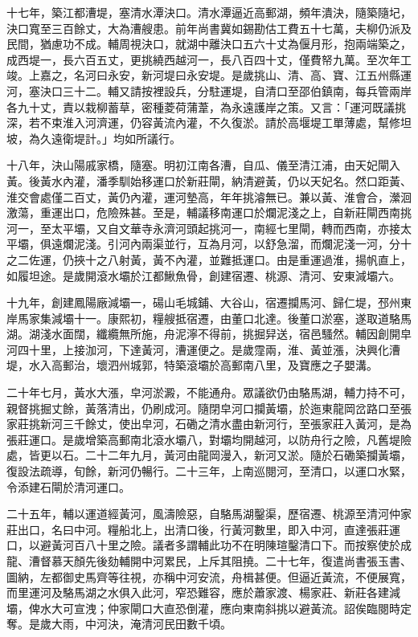 \begin{pinyinscope}
十七年，築江都漕堤，塞清水潭決口。清水潭逼近高郵湖，頻年潰決，隨築隨圮，決口寬至三百餘丈，大為漕艘患。前年尚書冀如錫勘估工費五十七萬，夫柳仍派及民間，猶慮功不成。輔周視決口，就湖中離決口五六十丈為偃月形，抱兩端築之，成西堤一，長六百五丈，更挑繞西越河一，長八百四十丈，僅費帑九萬。至次年工竣。上嘉之，名河曰永安，新河堤曰永安堤。是歲挑山、清、高、寶、江五州縣運河，塞決口三十二。輔又請按裡設兵，分駐運堤，自清口至邵伯鎮南，每兵管兩岸各九十丈，責以栽柳蓄草，密種菱荷蒲葦，為永遠護岸之策。又言：「運河既議挑深，若不束淮入河濟運，仍容黃流內灌，不久復淤。請於高堰堤工單薄處，幫修坦坡，為久遠衛堤計。」均如所議行。

十八年，決山陽戚家橋，隨塞。明初江南各漕，自瓜、儀至清江浦，由天妃閘入黃。後黃水內灌，潘季馴始移運口於新莊閘，納清避黃，仍以天妃名。然口距黃、淮交會處僅二百丈，黃仍內灌，運河墊高，年年挑濬無已。兼以黃、淮會合，瀠洄激蕩，重運出口，危險殊甚。至是，輔議移南運口於爛泥淺之上，自新莊閘西南挑河一，至太平壩，又自文華寺永濟河頭起挑河一，南經七里閘，轉而西南，亦接太平壩，俱遠爛泥淺。引河內兩渠並行，互為月河，以舒急溜，而爛泥淺一河，分十之二佐運，仍挾十之八射黃，黃不內灌，並難抵運口。由是重運過淮，揚帆直上，如履坦途。是歲開滾水壩於江都鰍魚骨，創建宿遷、桃源、清河、安東減壩六。

十九年，創建鳳陽廠減壩一，碭山毛城鋪、大谷山，宿遷攔馬河、歸仁堤，邳州東岸馬家集減壩十一。康熙初，糧艘抵宿遷，由董口北達。後董口淤塞，遂取道駱馬湖。湖淺水面闊，纖纜無所施，舟泥濘不得前，挑掘舁送，宿邑騷然。輔因創開皁河四十里，上接泇河，下達黃河，漕運便之。是歲霪兩，淮、黃並漲，決興化漕堤，水入高郵治，壞泗州城郭，特築滾壩於高郵南八里，及寶應之子嬰溝。

二十年七月，黃水大漲，皁河淤澱，不能通舟。眾議欲仍由駱馬湖，輔力持不可，親督挑掘丈餘，黃落清出，仍刷成河。隨閉皁河口攔黃壩，於迤東龍岡岔路口至張家莊挑新河三千餘丈，使出皁河，石磡之清水盡由新河行，至張家莊入黃河，是為張莊運口。是歲增築高郵南北滾水壩八，對壩均開越河，以防舟行之險，凡舊堤險處，皆更以石。二十二年九月，黃河由龍岡漫入，新河又淤。隨於石磡築攔黃壩，復設法疏導，旬餘，新河仍暢行。二十三年，上南巡閱河，至清口，以運口水緊，令添建石閘於清河運口。

二十五年，輔以運道經黃河，風濤險惡，自駱馬湖鑿渠，歷宿遷、桃源至清河仲家莊出口，名曰中河。糧船北上，出清口後，行黃河數里，即入中河，直達張莊運口，以避黃河百八十里之險。議者多謂輔此功不在明陳瑄鑿清口下。而按察使於成龍、漕督慕天顏先後劾輔開中河累民，上斥其阻撓。二十七年，復遣尚書張玉書、圖納，左都御史馬齊等往視，亦稱中河安流，舟楫甚便。但逼近黃流，不便展寬，而里運河及駱馬湖之水俱入此河，窄恐難容，應於蕭家渡、楊家莊、新莊各建減壩，俾水大可宣洩；仲家閘口大直恐倒灌，應向東南斜挑以避黃流。詔俟臨閱時定奪。是歲大雨，中河決，淹清河民田數千頃。


\end{pinyinscope}

